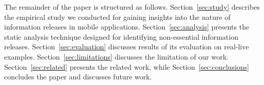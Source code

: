 The remainder of the paper is structured as follows. Section~\ref{sec:study} describes the empirical study we conducted for gaining insights into the nature of information releases in mobile applications. Section~\ref{sec:analysis} presents the static analysis technique designed for identifying non-essential information releases. 
Section~\ref{sec:evaluation} discusses results of its evaluation on real-live examples. Section~\ref{sec:limitations} discusses the limitation of our work. Section~\ref{sec:related} presents the related work, while Section~\ref{sec:conclusions} concludes the paper and discusses future work. 



